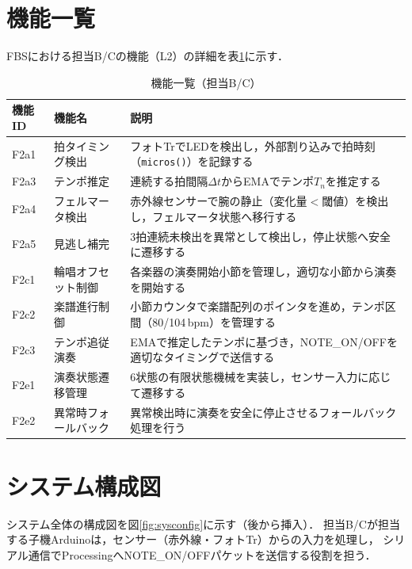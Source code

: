 \section{機能一覧}

FBSにおける担当B/Cの機能（L2）の詳細を表\ref{tab:functions}に示す．

\begin{table}[H]
  \centering
  \begin{tabularx}{\linewidth}{llX}
    \toprule
    機能ID & 機能名 & 説明 \\
    \midrule
    F2a1 & 拍タイミング検出 &
      フォトTrでLEDを検出し，外部割り込みで拍時刻（\texttt{micros()}）を記録する \\
    F2a3 & テンポ推定 &
      連続する拍間隔$\Delta t$からEMAでテンポ$T_n$を推定する \\
    F2a4 & フェルマータ検出 &
      赤外線センサーで腕の静止（変化量$<$閾値）を検出し，フェルマータ状態へ移行する \\
    F2a5 & 見逃し補完 &
      3拍連続未検出を異常として検出し，停止状態へ安全に遷移する \\
    F2c1 & 輪唱オフセット制御 &
      各楽器の演奏開始小節を管理し，適切な小節から演奏を開始する \\
    F2c2 & 楽譜進行制御 &
      小節カウンタで楽譜配列のポインタを進め，テンポ区間（80/104\,bpm）を管理する \\
    F2c3 & テンポ追従演奏 &
      EMAで推定したテンポに基づき，NOTE\_ON/OFFを適切なタイミングで送信する \\
    F2e1 & 演奏状態遷移管理 &
      6状態の有限状態機械を実装し，センサー入力に応じて遷移する \\
    F2e2 & 異常時フォールバック &
      異常検出時に演奏を安全に停止させるフォールバック処理を行う \\
    \bottomrule
  \end{tabularx}
  \caption{機能一覧（担当B/C）}
  \label{tab:functions}
\end{table}

\section{システム構成図}

システム全体の構成図を図\ref{fig:sysconfig}に示す（後から挿入）．
担当B/Cが担当する子機Arduinoは，センサー（赤外線・フォトTr）からの入力を処理し，
シリアル通信でProcessingへNOTE\_ON/OFFパケットを送信する役割を担う．

